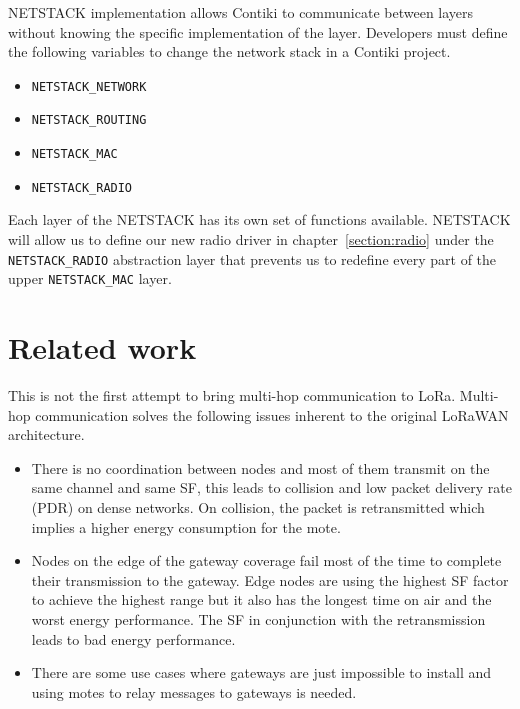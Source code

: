 NETSTACK implementation allows Contiki to communicate between layers without
knowing the specific implementation of the layer.
Developers must define the following variables to change the network stack
in a Contiki project.

\begin{itemize}
  \item \lstinline{NETSTACK_NETWORK}
  \item \lstinline{NETSTACK_ROUTING}
  \item \lstinline{NETSTACK_MAC}
  \item \lstinline{NETSTACK_RADIO}
\end{itemize}

Each layer of the NETSTACK has its own set of functions available.
NETSTACK will allow us to define our new radio driver in
chapter~\ref{section:radio} under the \lstinline{NETSTACK_RADIO}
abstraction layer that prevents us to redefine every part of the upper
\lstinline{NETSTACK_MAC} layer.



\section{Related work}

This is not the first attempt to bring multi-hop communication to LoRa.
Multi-hop communication solves the following issues inherent to the original
LoRaWAN architecture.

\begin{itemize}
  \item There is no coordination between nodes and most of them transmit on the
    same channel and same SF, this leads to collision and low packet delivery
    rate (PDR) on dense networks. On collision, the packet is retransmitted
    which implies a higher energy consumption for the mote.
  \item Nodes on the edge of the gateway coverage fail most of the time to
    complete their transmission to the gateway. Edge nodes are using the
    highest SF factor to achieve the highest range but it also has
    the longest time on air and the worst energy performance.
    The SF in conjunction with the retransmission leads to bad energy performance.
  \item There are some use cases where gateways are just impossible to install
    and using motes to relay messages to gateways is needed.
\end{itemize}

